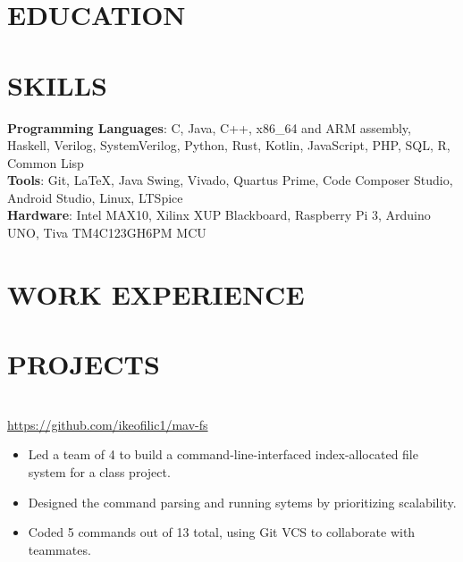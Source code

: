 \documentclass[10pt,letterpaper]{article}
\begin{document}


\section*{EDUCATION}
    

\section*{SKILLS}
    \textbf{Programming Languages}: C, Java, C++, x86\_64 and ARM assembly, Haskell, Verilog, SystemVerilog, Python, Rust, Kotlin, JavaScript, PHP, SQL, R, Common Lisp \\
    \textbf{Tools}: Git, \LaTeX{}, Java Swing, Vivado, Quartus Prime, Code Composer Studio, Android Studio, Linux, LTSpice\\
    \textbf{Hardware}: Intel MAX10, Xilinx XUP Blackboard, Raspberry Pi 3, Arduino UNO, Tiva TM4C123GH6PM MCU \\
    

\section*{WORK EXPERIENCE}
    
    \vspace{0.35\baselineskip} %
    

\section*{PROJECTS}
    \\
    {\url{https://github.com/ikeofilic1/mav-fs}}
    \begin{itemize}
        \item Led a team of 4 to build a command-line-interfaced index-allocated file system for a class project.
        \item Designed the command parsing and running sytems by prioritizing scalability.
        \item Coded 5 commands out of 13 total, using Git VCS to collaborate with teammates.
    \end{itemize}
\end{document}
